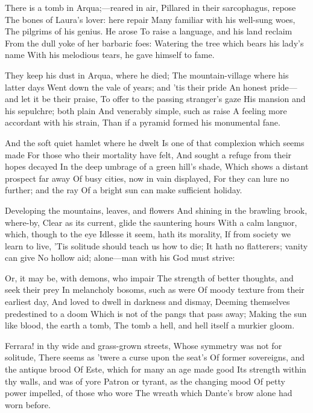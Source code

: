 \documentclass[10pt,twocolumn]{book}
\begin{document}
   There is a tomb in Arqua;---reared in air,
   Pillared in their sarcophagus, repose
   The bones of Laura's lover:  here repair
   Many familiar with his well-sung woes,
   The pilgrims of his genius.  He arose
   To raise a language, and his land reclaim
   From the dull yoke of her barbaric foes:
   Watering the tree which bears his lady's name
With his melodious tears, he gave himself to fame.


   They keep his dust in Arqua, where he died;
   The mountain-village where his latter days
   Went down the vale of years; and 'tis their pride\textemdash
   An honest pride---and let it be their praise,
   To offer to the passing stranger's gaze
   His mansion and his sepulchre; both plain
   And venerably simple, such as raise
   A feeling more accordant with his strain,
Than if a pyramid formed his monumental fane.


   And the soft quiet hamlet where he dwelt
   Is one of that complexion which seems made
   For those who their mortality have felt,
   And sought a refuge from their hopes decayed
   In the deep umbrage of a green hill's shade,
   Which shows a distant prospect far away
   Of busy cities, now in vain displayed,
   For they can lure no further; and the ray
Of a bright sun can make sufficient holiday.


   Developing the mountains, leaves, and flowers
   And shining in the brawling brook, where-by,
   Clear as its current, glide the sauntering hours
   With a calm languor, which, though to the eye
   Idlesse it seem, hath its morality,
   If from society we learn to live,
   'Tis solitude should teach us how to die;
   It hath no flatterers; vanity can give
No hollow aid; alone---man with his God must strive:


   Or, it may be, with demons, who impair
   The strength of better thoughts, and seek their prey
   In melancholy bosoms, such as were
   Of moody texture from their earliest day,
   And loved to dwell in darkness and dismay,
   Deeming themselves predestined to a doom
   Which is not of the pangs that pass away;
   Making the sun like blood, the earth a tomb,
The tomb a hell, and hell itself a murkier gloom.


   Ferrara! in thy wide and grass-grown streets,
   Whose symmetry was not for solitude,
   There seems as 'twere a curse upon the seat's
   Of former sovereigns, and the antique brood
   Of Este, which for many an age made good
   Its strength within thy walls, and was of yore
   Patron or tyrant, as the changing mood
   Of petty power impelled, of those who wore
The wreath which Dante's brow alone had worn before.
\end{document}

